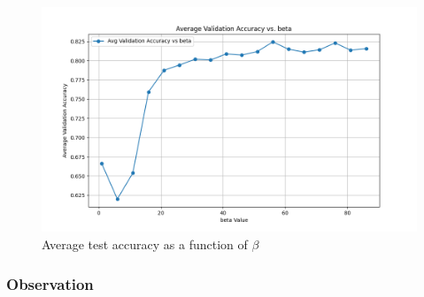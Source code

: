 \begin{figure}[H]
    \centering
    \includegraphics[width=0.8\linewidth]{results/graphs/beta-validation.png}
    \caption{Average test accuracy as a function of $\beta$}
    \label{fig:beta-validation}
\end{figure}


\subsubsection{Observation}

